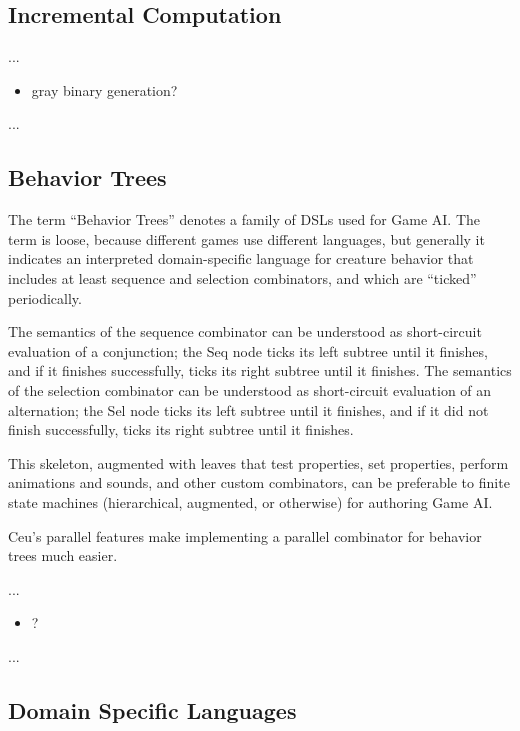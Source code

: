 \documentclass{acm_proc_article-sp}
\begin{document}
\subsection{Incremental Computation}

...

\begin{itemize}
\item gray binary generation?
\end{itemize}

...

\subsection{Behavior Trees}

The term ``Behavior Trees'' denotes a family of DSLs 
used for Game AI.
The term is loose, because different games use different languages,
but generally it indicates an interpreted domain-specific language
for creature behavior that includes at least sequence and selection combinators,
and which are ``ticked'' periodically.

The semantics of the sequence combinator can be understood as short-circuit evaluation of a conjunction;
the Seq node ticks its left subtree until it finishes,
and if it finishes successfully, ticks its right subtree until it finishes.
The semantics of the selection combinator can be understood as short-circuit evaluation of an alternation;
the Sel node ticks its left subtree until it finishes,
and if it did not finish successfully, ticks its right subtree until it finishes.

This skeleton, augmented with leaves that test properties, set properties, perform animations and sounds,
and other custom combinators, can be preferable to finite state machines (hierarchical, augmented, or otherwise) for authoring Game AI.

Ceu's parallel features make implementing a parallel combinator for behavior trees much easier.

...

\begin{itemize}
\item ?
\end{itemize}

...

\subsection{Domain Specific Languages}
\end{document}
